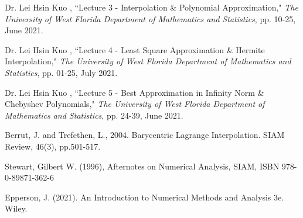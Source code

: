 \documentclass[11pt]{article}%
\begin{document}
\begin{thebibliography}{9}

 Dr. Lei Hsin Kuo , ``Lecture 3 - Interpolation \& Polynomial Approximation," \emph{The University of West Florida Department of Mathematics and Statistics}, pp. 10-25, June 2021.

 Dr. Lei Hsin Kuo , ``Lecture 4 - Least Square Approximation \& Hermite Interpolation," \emph{The University of West Florida Department of Mathematics and Statistics}, pp. 01-25, July 2021.

 Dr. Lei Hsin Kuo , ``Lecture 5 - Best Approximation in Infinity Norm \& Chebyshev Polynomials," \emph{The University of West Florida Department of Mathematics and Statistics}, pp. 24-39, June 2021.

 Berrut, J. and Trefethen, L., 2004. Barycentric Lagrange Interpolation. SIAM Review, 46(3), pp.501-517.

 Stewart, Gilbert W. (1996), Afternotes on Numerical Analysis, SIAM, ISBN 978-0-89871-362-6

 Epperson, J. (2021). An Introduction to Numerical Methods and Analysis 3e. Wiley. 

\end{thebibliography}
\end{document}
